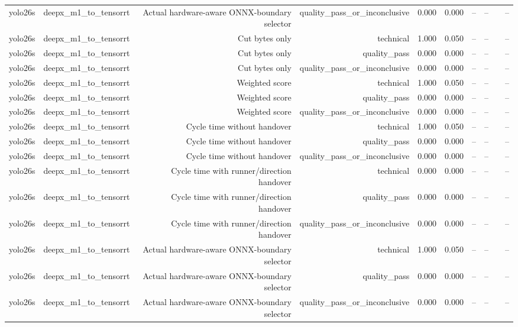 \begin{table}[t]
\begin{tabular}{lrrrrrrrrr}
yolo26s & deepx\_m1\_to\_tensorrt & Actual hardware-aware ONNX-boundary selector & quality\_pass\_or\_inconclusive & 0.000 & 0.000 & -- & -- &  & -- \\
yolo26s & deepx\_m1\_to\_tensorrt & Cut bytes only & technical & 1.000 & 0.050 & -- & -- &  & -- \\
yolo26s & deepx\_m1\_to\_tensorrt & Cut bytes only & quality\_pass & 0.000 & 0.000 & -- & -- &  & -- \\
yolo26s & deepx\_m1\_to\_tensorrt & Cut bytes only & quality\_pass\_or\_inconclusive & 0.000 & 0.000 & -- & -- &  & -- \\
yolo26s & deepx\_m1\_to\_tensorrt & Weighted score & technical & 1.000 & 0.050 & -- & -- &  & -- \\
yolo26s & deepx\_m1\_to\_tensorrt & Weighted score & quality\_pass & 0.000 & 0.000 & -- & -- &  & -- \\
yolo26s & deepx\_m1\_to\_tensorrt & Weighted score & quality\_pass\_or\_inconclusive & 0.000 & 0.000 & -- & -- &  & -- \\
yolo26s & deepx\_m1\_to\_tensorrt & Cycle time without handover & technical & 1.000 & 0.050 & -- & -- &  & -- \\
yolo26s & deepx\_m1\_to\_tensorrt & Cycle time without handover & quality\_pass & 0.000 & 0.000 & -- & -- &  & -- \\
yolo26s & deepx\_m1\_to\_tensorrt & Cycle time without handover & quality\_pass\_or\_inconclusive & 0.000 & 0.000 & -- & -- &  & -- \\
yolo26s & deepx\_m1\_to\_tensorrt & Cycle time with runner/direction handover & technical & 0.000 & 0.000 & -- & -- &  & -- \\
yolo26s & deepx\_m1\_to\_tensorrt & Cycle time with runner/direction handover & quality\_pass & 0.000 & 0.000 & -- & -- &  & -- \\
yolo26s & deepx\_m1\_to\_tensorrt & Cycle time with runner/direction handover & quality\_pass\_or\_inconclusive & 0.000 & 0.000 & -- & -- &  & -- \\
yolo26s & deepx\_m1\_to\_tensorrt & Actual hardware-aware ONNX-boundary selector & technical & 1.000 & 0.050 & -- & -- &  & -- \\
yolo26s & deepx\_m1\_to\_tensorrt & Actual hardware-aware ONNX-boundary selector & quality\_pass & 0.000 & 0.000 & -- & -- &  & -- \\
yolo26s & deepx\_m1\_to\_tensorrt & Actual hardware-aware ONNX-boundary selector & quality\_pass\_or\_inconclusive & 0.000 & 0.000 & -- & -- &  & -- \\

\end{tabular}
\end{table}
